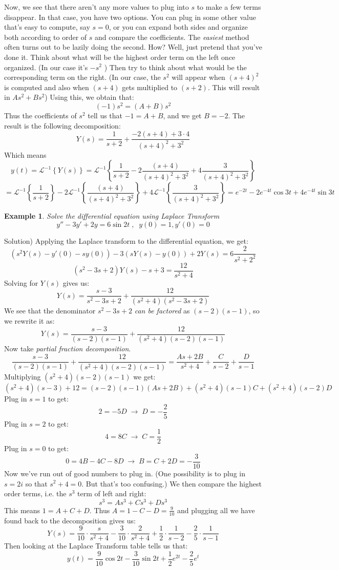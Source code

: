 \documentclass[12pt]{report}
\newtheorem{ex}{Example}[section]
\begin{document}
Now, we see that there aren't any more values to plug into $s$ to make a few terms disappear. In that case, you have two options. You can plug in some other value that's easy to compute, say $s=0$, or you can expand both sides and organize both according to order of $s$ and compare the coefficients. The \textit{easiest} method often turns out to be lazily doing the second. How? Well, just pretend that you've done it. Think about what will be the highest order term on the left once organized. (In our case it's $-s^2$ ) Then try to think about what would be the corresponding term on the right. (In our case, the $s^2$ will appear when $(s+4)^2$ is computed and also when $(s+4)$ gets multiplied to $(s+2)$. This will result in $As^2 + Bs^2$) Using this, we obtain that:
$$(-1)s^2 = (A+B) s^2$$
Thus the coefficients of $s^2$ tell us that $-1=A+B$, and we get $B=-2$.
The result is the following decomposition:
$$Y(s) = \frac{1}{s+2}+\frac{-2(s+4)+ 3\cdot 4}{(s+4)^2 + 3^2} $$
Which means
$$y(t) = \mathscr{L}^{-1} \left\{ Y(s) \right\} = \mathscr{L}^{-1} \left\{ \frac{1}{s+2}-2\frac{(s+4)}{(s+4)^2 + 3^2}+4\frac{3}{(s+4)^2 + 3^2}\right\} $$
$$= \mathscr{L}^{-1} \left\{ \frac{1}{s+2}\right\} - 2\mathscr{L}^{-1} \left\{ \frac{(s+4)}{(s+4)^2 + 3^2} \right\}+4 \mathscr{L}^{-1} \left\{ \frac{3}{(s+4)^2 + 3^2} \right\} = e^{-2t} -2 e^{-4t}\cos 3t+ 4e^{-4t}\sin 3t $$

\begin{ex}
	Solve the differential equation using Laplace Transform
$$y'' - 3y' +2y = 6 \sin 2t  \; , \; \; y(0)=1, y'(0)=0$$
\end{ex}
Solution)
Applying the Laplace transform to the differential equation, we get:
$$ \left( s^2 Y(s) - y'(0) - s y(0) \right) -3 \left( s Y(s) - y(0) \right) + 2 Y(s) =6 \frac{2}{s^2+2^2} $$
$$ \left( s^2 -3s + 2 \right) Y(s) - s  +3  =  \frac{12}{s^2+4} $$
Solving for $Y(s)$ gives us:
$$ Y(s) = \frac{s-3}{s^2 -3s + 2} + \frac{12}{(s^2+4)(s^2 -3s + 2)} $$
We see that the denominator $s^2 -3s + 2$ \textit{can be factored} as $(s-2)(s-1)$, so we rewrite it as:
$$ Y(s) = \frac{s-3}{(s-2)(s-1)} + \frac{12}{(s^2+4)(s-2)(s-1)} $$
Now take \textit{partial fraction decomposition}.
$$\frac{s-3}{(s-2)(s-1)} + \frac{12}{(s^2+4)(s-2)(s-1)} = \frac{As+2B}{s^2+4}+\frac{C}{s-2}+\frac{D}{s-1} $$
Multiplying $(s^2+4)(s-2)(s-1)$ we get:
$$(s^2+4)(s-3)+12 = (s-2)(s-1)(As+2B)+ (s^2+4)(s-1)C+ (s^2+4)(s-2)D$$
Plug in $s=1$ to get:
$$ 2 = -5D  \; \rightarrow \; D= -\frac{2}{5}$$
Plug in $s=2$ to get:
$$ 4 = 8C  \; \rightarrow \; C= \frac{1}{2} $$
Plug in $s=0$ to get:
$$ 0 = 4B -4C -8D  \; \rightarrow \; B = C + 2D =  -\frac{3}{10} $$
Now we've run out of good numbers to plug in. (One possibility is to plug in $s=2i$ so that $s^2+4=0$. But that's too confusing.)
We then compare the highest order terms, i.e. the $s^3$ term of left and right:
$$s^3 = As^3 + Cs^3 + Ds^3$$
This means $1=A+C+D$.
Thus $A = 1-C-D= \frac{9}{10} $ and plugging all we have found back to the decomposition gives us:
$$Y(s) = \frac{9}{10}\cdot \frac{s}{s^2+4}-\frac{3}{10}\cdot\frac{2}{s^2+4}+ \frac{1}{2}\cdot\frac{1}{s-2}-\frac{2}{5}\cdot\frac{1}{s-1} $$
Then looking at the Laplace Transform table tells us that:
$$y(t) = \frac{9}{10} \cos 2t -\frac{3}{10}\sin 2t + \frac{1}{2} e^{2t} -\frac{2}{5} e^t $$
\end{document}
